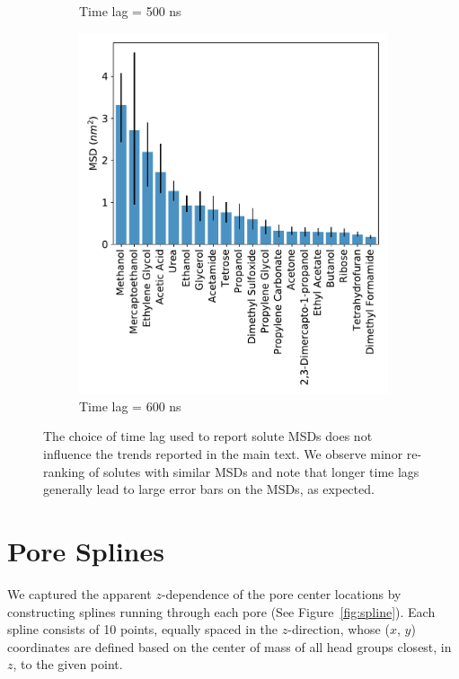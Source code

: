 \documentclass{article}
\begin{document}
\begin{figure}[!htb]
\begin{subfigure}{0.325\textwidth}
  \caption{Time lag = 500 ns}\label{fig:F0.5}
  \end{subfigure}
  \begin{subfigure}{0.325\textwidth}
  \includegraphics[width=\textwidth]{all_10wt_tamsds_F0_6.pdf}
  \caption{Time lag = 600 ns}\label{fig:F0.6}
  \end{subfigure}
  \caption{The choice of time lag used to report solute MSDs does not 
  influence the trends reported in the main text. We observe minor re-ranking
  of solutes with similar MSDs and note that longer time lags generally
  lead to large error bars on the MSDs, as expected. }\label{fig:lag_sensitivity}
  \end{figure}
  
  \section{Pore Splines}\label{section:splines}
  
  We captured the apparent $z$-dependence of the pore center locations by
  constructing splines running through each pore (See Figure~\ref{fig:spline}).
  Each spline consists of 10 points, equally spaced in the $z$-direction, whose
  ($x$, $y$) coordinates are defined based on the center of mass of all head
  groups closest, in $z$, to the given point.
  
\end{document}

